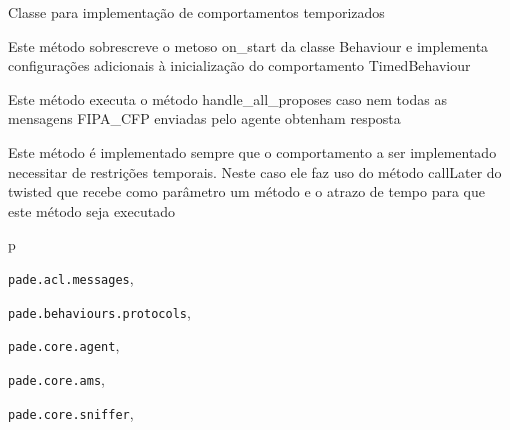 \documentclass[letterpaper,10pt,brazil]{sphinxmanual}
\begin{document}

\begin{fulllineitems}
\label{api:pade.behaviours.protocols.TimedBehaviour}
Classe para implementação de comportamentos temporizados

\begin{fulllineitems}
\label{api:pade.behaviours.protocols.TimedBehaviour.on_start}
Este método sobrescreve o metoso on\_start da classe
Behaviour e implementa configurações adicionais
à inicialização do comportamento TimedBehaviour

\end{fulllineitems}


\begin{fulllineitems}
\label{api:pade.behaviours.protocols.TimedBehaviour.on_time}
Este método executa o método handle\_all\_proposes caso nem
todas as mensagens FIPA\_CFP enviadas pelo agente obtenham
resposta

\end{fulllineitems}


\begin{fulllineitems}
\label{api:pade.behaviours.protocols.TimedBehaviour.timed_behaviour}
Este método é implementado sempre que o comportamento a ser 
implementado necessitar de restrições temporais.
Neste caso ele faz uso do método callLater do twisted 
que recebe como parâmetro um método e o atrazo de tempo para
que este método seja executado

\end{fulllineitems}


\end{fulllineitems}



\renewcommand{\indexname}{Índice de Módulos do Python}
\begin{theindex}
\def\bigletter#1{{\Large\sffamily#1}\nopagebreak\vspace{1mm}}
\bigletter{p}
\item {\texttt{pade.acl.messages}}, \pageref{api:module-pade.acl.messages}
\item {\texttt{pade.behaviours.protocols}}, \pageref{api:module-pade.behaviours.protocols}
\item {\texttt{pade.core.agent}}, \pageref{api:module-pade.core.agent}
\item {\texttt{pade.core.ams}}, \pageref{api:module-pade.core.ams}
\item {\texttt{pade.core.sniffer}}, \pageref{api:module-pade.core.sniffer}
\end{theindex}

\renewcommand{\indexname}{Índice}
\printindex
\end{document}

